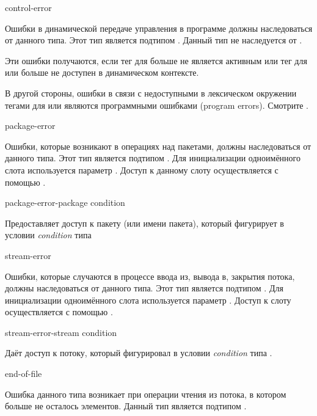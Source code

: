 \begin{defun}[Тип]
control-error

Ошибки в динамической передаче управления в программе должны наследоваться от
данного типа. Этот тип является подтипом . Данный тип не наследуется
от .

Эти ошибки получаются, если тег для  больше не является активным или
тег для  или  больше не доступен в динамическом
контексте.

В другой стороны, ошибки в связи с недоступными в лексическом окружении тегами
для  или  являются программными ошибками (program
errors). Смотрите .
\end{defun}


\begin{defun}[Тип]
package-error

Ошибки, которые возникают в операциях над пакетами, должны наследоваться от
данного типа. Этот тип является подтипом . Для инициализации
одноимённого слота используется параметр . Доступ к данному слоту
осуществляется с помощью .
\end{defun}

\begin{defun}[Функция]
package-error-package condition

Предоставляет доступ к пакету (или имени пакета), который фигурирует в условии
\emph{condition} типа 
\end{defun}

\begin{defun}[Тип]
stream-error

Ошибки, которые случаются в процессе ввода из, вывода в, закрытия потока, должны
наследоваться от данного типа. Этот тип является подтипом . Для
инициализации одноимённого слота используется параметр . Доступ к
слоту осуществляется с помощью .
\end{defun}

\begin{defun}[Функция]
stream-error-stream condition

Даёт доступ к потоку, который фигурировал в условии \emph{condition} типа
.
\end{defun}

\begin{defun}[Тип]
end-of-file

Ошибка данного типа возникает при операции чтения из потока, в котором больше не
осталось элементов. Данный тип является подтипом .
\end{defun}

